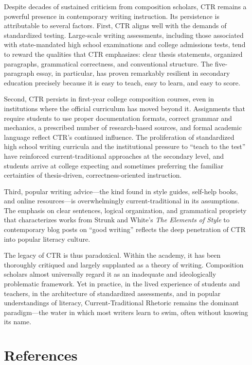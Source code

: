 \documentclass[12pt]{article}
\begin{document}
Despite decades of sustained criticism from composition scholars, CTR remains a powerful presence in contemporary writing instruction. Its persistence is attributable to several factors. First, CTR aligns well with the demands of standardized testing. Large-scale writing assessments, including those associated with state-mandated high school examinations and college admissions tests, tend to reward the qualities that CTR emphasizes: clear thesis statements, organized paragraphs, grammatical correctness, and conventional structure. The five-paragraph essay, in particular, has proven remarkably resilient in secondary education precisely because it is easy to teach, easy to learn, and easy to score.

Second, CTR persists in first-year college composition courses, even in institutions where the official curriculum has moved beyond it. Assignments that require students to use proper documentation formats, correct grammar and mechanics, a prescribed number of research-based sources, and formal academic language reflect CTR's continued influence. The proliferation of standardized high school writing curricula and the institutional pressure to ``teach to the test'' have reinforced current-traditional approaches at the secondary level, and students arrive at college expecting and sometimes preferring the familiar certainties of thesis-driven, correctness-oriented instruction.

Third, popular writing advice---the kind found in style guides, self-help books, and online resources---is overwhelmingly current-traditional in its assumptions. The emphasis on clear sentences, logical organization, and grammatical propriety that characterizes works from Strunk and White's \textit{The Elements of Style} to contemporary blog posts on ``good writing'' reflects the deep penetration of CTR into popular literacy culture.

The legacy of CTR is thus paradoxical. Within the academy, it has been thoroughly critiqued and largely supplanted as a theory of writing. Composition scholars almost universally regard it as an inadequate and ideologically problematic framework. Yet in practice, in the lived experience of students and teachers, in the architecture of standardized assessments, and in popular understandings of literacy, Current-Traditional Rhetoric remains the dominant paradigm---the water in which most writers learn to swim, often without knowing its name.

\section*{References}
\end{document}
